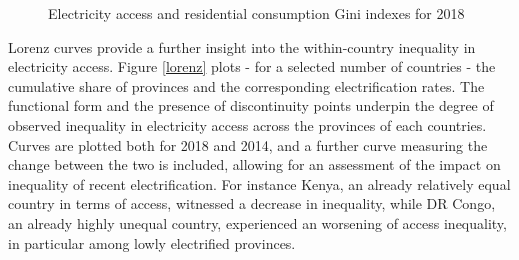 \documentclass[preprint,12pt]{elsarticle}
\begin{document}
\begin{figure}[H]
    \centering
    \qquad
    \caption{Electricity access and residential consumption Gini indexes for 2018}
      \label{maps}
\end{figure}

Lorenz curves provide a further insight into the within-country inequality in electricity access. Figure \ref{lorenz} plots - for a selected number of countries - the cumulative share of provinces and the corresponding electrification rates. The functional form and the presence of discontinuity points underpin the degree of observed inequality in electricity access across the provinces of each countries. Curves are plotted both for 2018 and 2014, and a further curve measuring the change between the two is included, allowing for an assessment of the impact on inequality of recent electrification. For instance Kenya, an already relatively equal country in terms of access, witnessed a decrease in inequality, while DR Congo, an already highly unequal country, experienced an worsening of access inequality, in particular among lowly electrified provinces. 
\end{document}
